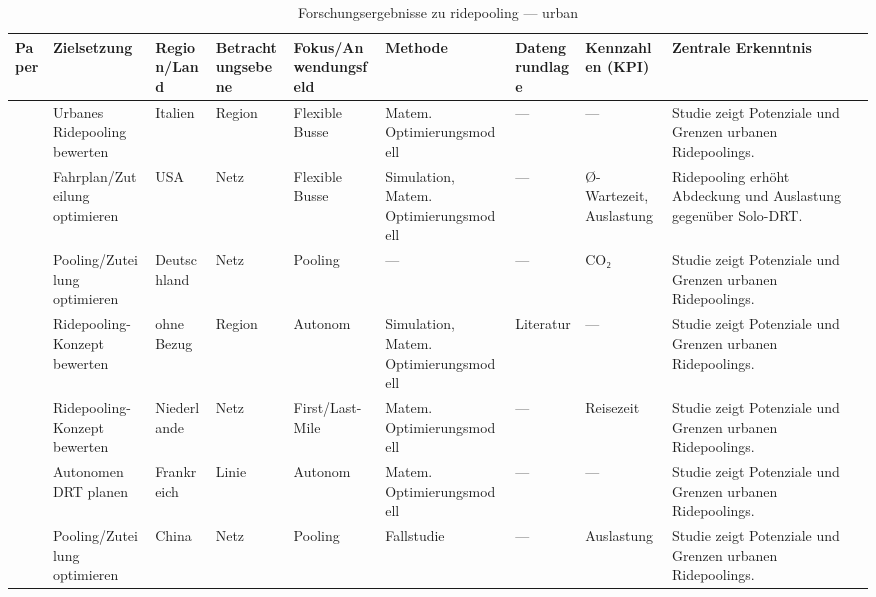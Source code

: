 \begin{table}[p]
\centering
\caption{Forschungsergebnisse zu ridepooling — urban}
\label{tab:ridepooling-urban-3}
\scriptsize
\setlength{\tabcolsep}{2.5pt}
\begin{tabularx}{\textwidth}{
  >{\RaggedRight\arraybackslash}p{2.8cm}
  >{\RaggedRight\arraybackslash}p{2.2cm}
  >{\RaggedRight\arraybackslash}p{1.8cm}
  >{\RaggedRight\arraybackslash}p{1.8cm}
  >{\RaggedRight\arraybackslash}p{2.0cm}
  >{\RaggedRight\arraybackslash}p{2.6cm}
  >{\RaggedRight\arraybackslash}p{1.8cm}
  >{\RaggedRight\arraybackslash}p{2.2cm}
  >{\RaggedRight\arraybackslash}X
}
\toprule
Paper & Zielsetzung & Region/Land & Betrachtungsebene & Fokus/Anwendungsfeld & Methode & Datengrundlage & Kennzahlen (KPI) & Zentrale Erkenntnis \\
\midrule
\textcite{garus\_2024\_exploringsustainab} & Urbanes Ridepooling bewerten & Italien & Region & Flexible Busse & Matem. Optimierungsmodell & — & — & Studie zeigt Potenziale und Grenzen urbanen Ridepoolings. \\ \hline
\textcite{jung\_2016\_dynamicsharedtaxid} & Fahrplan/Zuteilung optimieren & USA & Netz & Flexible Busse & Simulation, Matem. Optimierungsmodell & — & Ø-Wartezeit, Auslastung & Ridepooling erhöht Abdeckung und Auslastung gegenüber Solo-DRT. \\ \hline
\textcite{ko\_nig\_2018\_analyzingurbanresi} & Pooling/Zuteilung optimieren & Deutschland & Netz & Pooling & — & — & CO₂ & Studie zeigt Potenziale und Grenzen urbanen Ridepoolings. \\ \hline
\textcite{leich\_2019\_shouldautonomoussh} & Ridepooling-Konzept bewerten & ohne Bezug & Region & Autonom & Simulation, Matem. Optimierungsmodell & Literatur & — & Studie zeigt Potenziale und Grenzen urbanen Ridepoolings. \\ \hline
\textcite{liang\_2020\_automatedtaxisdial} & Ridepooling-Konzept bewerten & Niederlande & Netz & First/Last-Mile & Matem. Optimierungsmodell & — & Reisezeit & Studie zeigt Potenziale und Grenzen urbanen Ridepoolings. \\ \hline
\textcite{liu\_2024\_afilteringsystemto} & Autonomen DRT planen & Frankreich & Linie & Autonom & Matem. Optimierungsmodell & — & — & Studie zeigt Potenziale und Grenzen urbanen Ridepoolings. \\ \hline
\textcite{liu\_2025\_quantifyingthepote} & Pooling/Zuteilung optimieren & China & Netz & Pooling & Fallstudie & — & Auslastung & Studie zeigt Potenziale und Grenzen urbanen Ridepoolings. \\ \hline
\bottomrule
\end{tabularx}
\end{table}
